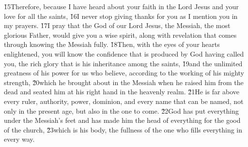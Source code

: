 \v{15}Therefore, because I have heard about your faith in the Lord Jesus and your love for all the saints, \v{16}I never stop giving thanks for you as I mention you in my prayers. \v{17}I pray that the God of our Lord Jesus, the Messiah, the most glorious Father, would give you a wise spirit, along with revelation that comes through knowing the Messiah fully. \v{18}Then, with the eyes of your hearts enlightened, you will know the confidence that is produced by God having called you, the rich glory that is his inheritance among the saints, \v{19}and the unlimited greatness of his power for us who believe, according to the working of his mighty strength, \v{20}which he brought about in the Messiah when he raised him from the dead and seated him at his right hand in the heavenly realm. \v{21}He is far above every ruler, authority, power, dominion, and every name that can be named, not only in the present age, but also in the one to come. \v{22}God has put everything under the Messiah's feet and has made him the head of everything for the good of the church, \v{23}which is his body, the fullness of the one who fills everything in every way.

